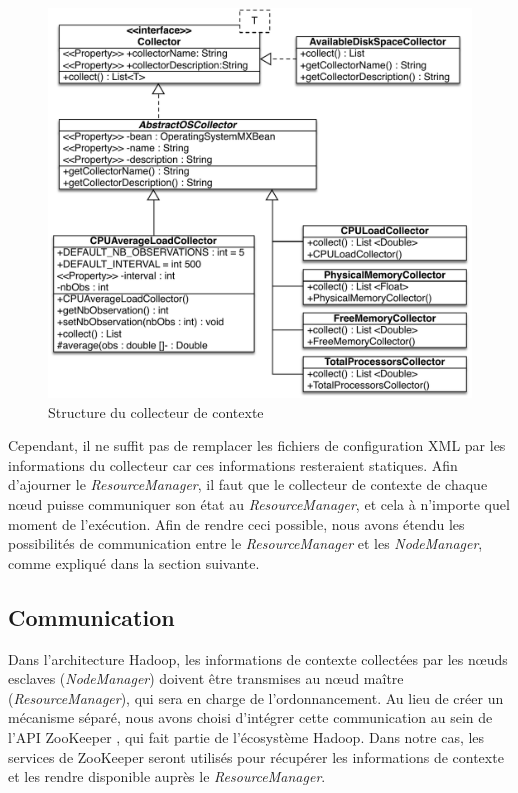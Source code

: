 \begin{figure}[!ht]
	\centering
	\includegraphics[width=0.75\linewidth]{img/CollectorUML2.pdf}
	\caption{Structure du collecteur de contexte}
	\label{fig:CollectorDiag}
\end{figure}

Cependant, il ne suffit pas de remplacer les fichiers de configuration XML par les informations du collecteur car ces informations resteraient statiques. Afin d'ajourner le \textit{ResourceManager}, il faut que le collecteur de contexte de chaque n{\oe}ud puisse communiquer son état au \textit{ResourceManager}, et cela à n'importe quel moment de l'exécution. Afin de rendre ceci possible, nous avons étendu les possibilités de communication entre le \textit{ResourceManager} et les \textit{NodeManager}, comme expliqué dans la section suivante.    

\subsection{Communication}
Dans l'architecture Hadoop, les informations de contexte collectées par les n{\oe}uds esclaves (\textit{NodeManager}) doivent être transmises au n{\oe}ud maître (\textit{ResourceManager}), qui sera en charge de l'ordonnancement. Au lieu de créer un mécanisme séparé, nous avons choisi d'intégrer cette communication au sein de l'API ZooKeeper \cite{Hunt2010}, qui fait partie de l'écosystème Hadoop. Dans notre cas, les services de ZooKeeper seront utilisés pour récupérer les informations de contexte et les rendre disponible auprès le \textit{ResourceManager}. 

